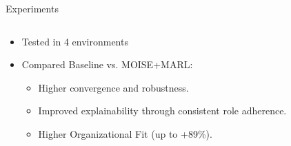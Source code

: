 \documentclass[9pt, aspectratio=169]{beamer}
\begin{document}
\begin{frame}{Experiments}

  \vspace{-0cm}

  \begin{columns}[c]

    \hspace{-1cm}

    \begin{column}{0.5\textwidth}
      \begin{itemize}
        \item Tested in 4 environments
        \item Compared Baseline vs. MOISE+MARL:
              \begin{itemize}
                \item Higher convergence and robustness.
                \item Improved explainability through consistent role adherence.
                \item Higher Organizational Fit (up to +89\%).
              \end{itemize}
      \end{itemize}
    \end{column}

    \hspace{-1cm}


\end{columns}
\end{frame}
\end{document}
